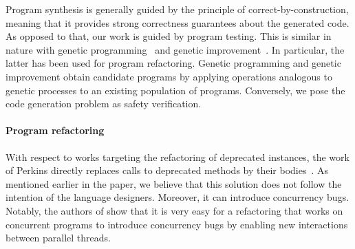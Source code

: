 \documentclass[sigconf,review,anonymous]{acmart}
\begin{document}



Program synthesis is generally guided by the principle of correct-by-construction, meaning that it provides strong correctness guarantees about the generated code.
As opposed to that, our work is guided by program testing. This is similar in nature with genetic programming~\cite{Koza92} and genetic improvement~\cite{DBLP:journals/dagstuhl-reports/PetkeGFL18,7911210}. In particular, the latter has been used for program refactoring. Genetic programming and genetic improvement obtain candidate programs by applying operations analogous to genetic processes to an existing population of programs. Conversely, we pose the code generation problem as safety verification.





\paragraph{Program refactoring}

With respect to works targeting the refactoring of deprecated instances, the work of Perkins directly replaces calls to deprecated methods by their bodies~\cite{DBLP:conf/paste/Perkins05}.
As mentioned earlier in the paper, we believe that this solution does not follow the intention of the language designers. Moreover, it can
introduce concurrency bugs. Notably, the authors of \cite{10.1007/978-3-642-14107-2_11}
show that it is very easy for a refactoring that works on concurrent
programs to introduce concurrency bugs by enabling new interactions between
parallel threads. %
\end{document}
